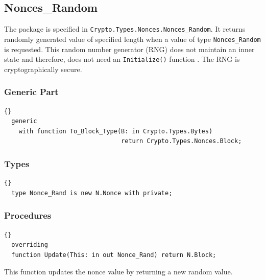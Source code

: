 
\subsection*{Nonces\_Random}
The package is specified in
\texttt{Crypto.Types.Nonces.Nonces\_Random}. It returns randomly
generated value of specified length when a value of type
\texttt{Nonces\_Random} is requested. This random number generator
(RNG) does not maintain an inner state and therefore, does not need an
\texttt{Initialize()} function \cite{DBLP:conf/isw/Zenner09}. The RNG
is cryptographically secure.


\subsubsection*{Generic Part}
\begin{lstlisting}{}
  generic
    with function To_Block_Type(B: in Crypto.Types.Bytes)
    							return Crypto.Types.Nonces.Block;
\end{lstlisting}


\subsubsection*{Types}
\begin{lstlisting}{}
  type Nonce_Rand is new N.Nonce with private;
\end{lstlisting}


\subsubsection*{Procedures}
\begin{lstlisting}{}
  overriding
  function Update(This: in out Nonce_Rand) return N.Block;
\end{lstlisting}
This function updates the nonce value by returning a new random value.



